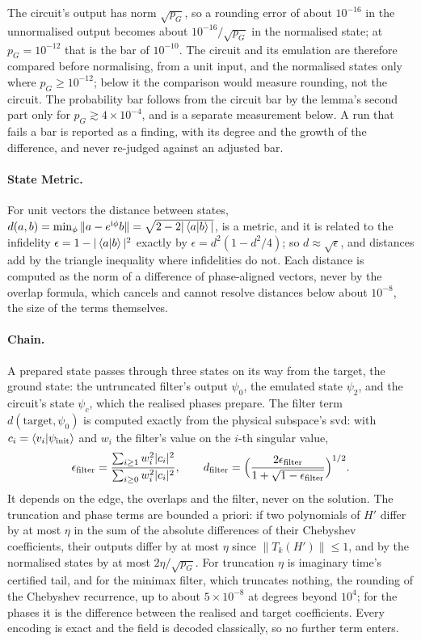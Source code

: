 The circuit's output has norm $\sqrt{p_G}$, so a rounding error of about $10^{-16}$ in the unnormalised output becomes about $10^{-16}/\sqrt{p_G}$ in the normalised state; at $p_G=10^{-12}$ that is the bar of $10^{-10}$. The circuit and its emulation are therefore compared before normalising, from a unit input, and the normalised states only where $p_G\ge10^{-12}$; below it the comparison would measure rounding, not the circuit. The probability bar follows from the circuit bar by the lemma's second part only for $p_G\gtrsim4\times10^{-4}$, and is a separate measurement below. A run that fails a bar is reported as a finding, with its degree and the growth of the difference, and never re-judged against an adjusted bar.

\paragraph{State Metric.} For unit vectors the distance between states, $d(a,b)=\min_\phi\|a-e^{\mathrm{i}\phi}b\|=\sqrt{2-2|\braket{a|b}|}$, is a metric, and it is related to the infidelity $\epsilon=1-|\braket{a|b}|^2$ exactly by $\epsilon=d^2(1-d^2/4)$; so $d\approx\sqrt\epsilon$, and distances add by the triangle inequality where infidelities do not. Each distance is computed as the norm of a difference of phase-aligned vectors, never by the overlap formula, which cancels and cannot resolve distances below about $10^{-8}$, the size of the terms themselves.

\paragraph{Chain.} A prepared state passes through three states on its way from the target, the ground state: the untruncated filter's output $\psi_0$, the emulated state $\psi_2$, and the circuit's state $\psi_c$, which the realised phases prepare. The filter term $d(\text{target},\psi_0)$ is computed exactly from the physical subspace's \gls{svd}: with $c_i=\braket{v_i|\psi_{\mathrm{init}}}$ and $w_i$ the filter's value on the $i$-th singular value,
\begin{equation*}
    \epsilon_{\mathrm{filter}}=\frac{\sum_{i\ge1}w_i^2|c_i|^2}{\sum_{i\ge0}w_i^2|c_i|^2},
    \qquad
    d_{\mathrm{filter}}=\Bigl(\frac{2\epsilon_{\mathrm{filter}}}{1+\sqrt{1-\epsilon_{\mathrm{filter}}}}\Bigr)^{1/2}.
\end{equation*}
It depends on the edge, the overlaps and the filter, never on the solution. The truncation and phase terms are bounded a priori: if two polynomials of $H'$ differ by at most $\eta$ in the sum of the absolute differences of their Chebyshev coefficients, their outputs differ by at most $\eta$ since $\|T_k(H')\|\le1$, and by  the normalised states by at most $2\eta/\sqrt{p_G}$. For truncation $\eta$ is imaginary time's certified tail, and for the minimax filter, which truncates nothing, the rounding of the Chebyshev recurrence, up to about $5\times10^{-8}$ at degrees beyond $10^4$; for the phases it is the difference between the realised and target coefficients. Every encoding is exact and the field is decoded classically, so no further term enters.

